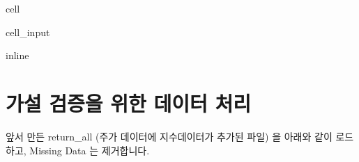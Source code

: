 \documentclass[letterpaper,10pt,english]{jupyterBook}
\begin{document}
\begin{sphinxuseclass}{cell}\begin{sphinxVerbatimInput}

\begin{sphinxuseclass}{cell_input}
\begin{sphinxVerbatim}[commandchars=\\\{\}]
   
 inline
   
   
   
 
  
 
\end{sphinxVerbatim}

\end{sphinxuseclass}\end{sphinxVerbatimInput}

\end{sphinxuseclass}

\part{가설 검증을 위한 데이터 처리}
\label{\detokenize{chapter4/4.4.4_Data_Processing:id1}}\label{\detokenize{chapter4/4.4.4_Data_Processing::doc}}
\sphinxAtStartPar
앞서 만든 return\_all (주가 데이터에 지수데이터가 추가된 파일) 을 아래와 같이 로드하고, Missing Data 는 제거합니다.
\end{document}
